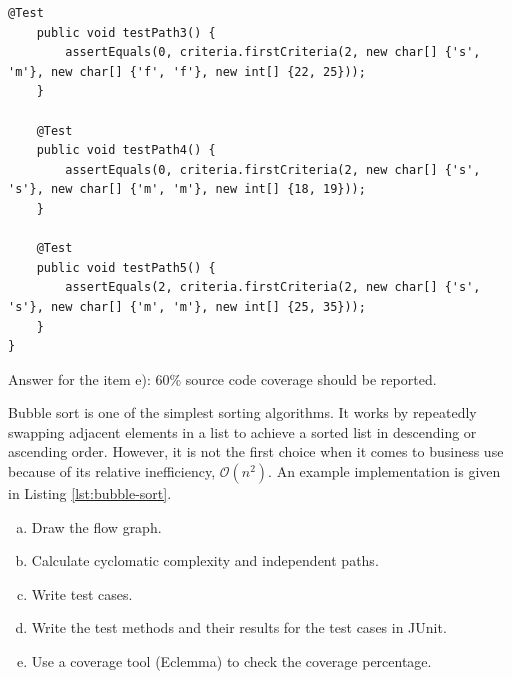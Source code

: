 \begin{solution}
\begin{lstlisting}[caption={All of the test cases that are defined by the independent paths of the recruitment program.}]
    @Test
    public void testPath3() {
        assertEquals(0, criteria.firstCriteria(2, new char[] {'s', 'm'}, new char[] {'f', 'f'}, new int[] {22, 25}));
    }
    
    @Test
    public void testPath4() {
        assertEquals(0, criteria.firstCriteria(2, new char[] {'s', 's'}, new char[] {'m', 'm'}, new int[] {18, 19}));
    }
    
    @Test
    public void testPath5() {
        assertEquals(2, criteria.firstCriteria(2, new char[] {'s', 's'}, new char[] {'m', 'm'}, new int[] {25, 35}));
    }
}
    \end{lstlisting}
    
    Answer for the item e): 60\% source code coverage should be reported.
\end{solution}

\begin{exercise}
    Bubble sort is one of the simplest sorting algorithms. It works by repeatedly swapping adjacent elements in a list to achieve a sorted list in descending or ascending order. However, it is not the first choice when it comes to business use because of its relative inefficiency, $\mathcal{O}(n^2)$. An example implementation is given in Listing \ref{lst:bubble-sort}.
    
    
    
    \begin{enumerate}[a),nosep]
        \item Draw the flow graph.
        \item Calculate cyclomatic complexity and independent paths.
        \item Write test cases.
        \item Write the test methods and their results for the test cases in JUnit.
        \item Use a coverage tool (Eclemma) to check the coverage percentage.
    \end{enumerate}
\end{exercise}

